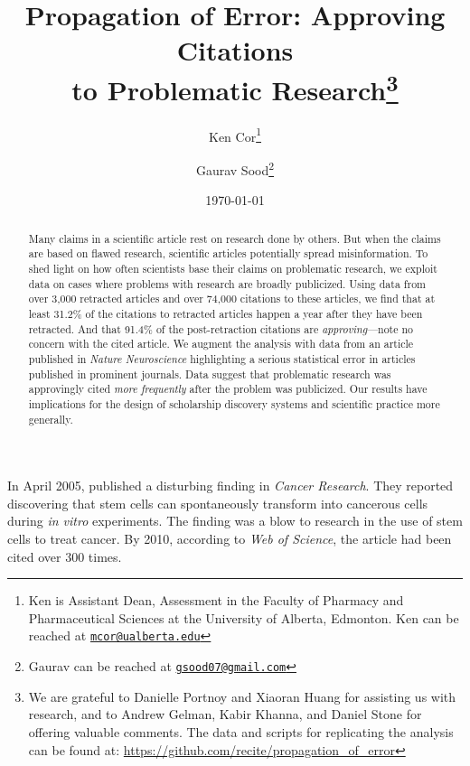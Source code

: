 \documentclass[12pt, letterpaper]{article}
\begin{document}
\title{\Large{Propagation of Error: Approving Citations\\ to Problematic Research}\footnote{We are grateful to Danielle Portnoy and Xiaoran Huang for assisting us with research, and to Andrew Gelman, Kabir Khanna, and Daniel Stone for offering valuable comments. The data and scripts for replicating the analysis can be found at: \href{https://github.com/recite/propagation_of_error}{https://github.com/recite/propagation\_of\_error}}\\\vspace{5mm}}

\author{Ken Cor\thanks{Ken is Assistant Dean, Assessment in the Faculty of Pharmacy and Pharmaceutical Sciences at the University of Alberta, Edmonton. Ken can be reached at \href{mailto:mcor@ualberta.edu}{\tt{mcor@ualberta.edu}}} \and Gaurav Sood\thanks{Gaurav can be reached at \href{mailto:gsood07@gmail.com}{\tt{gsood07@gmail.com}}}
\vspace{5mm}}
\date{\normalsize{\today}}
\maketitle

\vspace{.2cm}
\doublespacing
\clearpage
\begin{abstract}
Many claims in a scientific article rest on research done by others. But when the claims are based on flawed research, scientific articles potentially spread misinformation. To shed light on how often scientists base their claims on problematic research, we exploit data on cases where problems with research are broadly publicized. Using data from over 3,000 retracted articles and over 74,000 citations to these articles, we find that at least 31.2\% of the citations to retracted articles happen a year after they have been retracted. And that 91.4\% of the post-retraction citations are \textit{approving}---note no concern with the cited article. We augment the analysis with data from an article published in \textit{Nature Neuroscience} highlighting a serious statistical error in articles published in prominent journals. Data suggest that problematic research was approvingly cited \textit{more frequently} after the problem was publicized. Our results have implications for the design of scholarship discovery systems and scientific practice more generally.
\end{abstract}

\clearpage

In April 2005, \citet{rubio2005spontaneous} published a disturbing finding in \textit{Cancer Research}. They reported discovering that stem cells can spontaneously transform into cancerous cells during \textit{in vitro} experiments. The finding was a blow to research in the use of stem cells to treat cancer. By 2010, according to \textit{Web of Science}, the article had been cited over 300 times.
\end{document}
